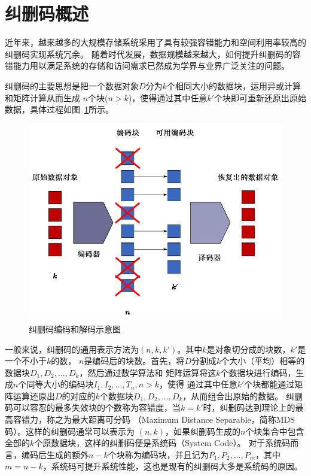 \section{纠删码概述}
近年来，越来越多的大规模存储系统采用了具有较强容错能力和空间利用率较高的纠删码实现系统冗余\citep{xia2007robustore,kubiatowicz2000oceanstore}。
随着时代发展，数据规模越来越大，如何提升纠删码的容错能力用以满足系统的存储和访问需求已然成为学界与业界广泛关注的问题。

纠删码的主要思想是把一个数据对象$D$分为$k$个相同大小的数据块，运用异或计算和矩阵计算从而生成
$n$个块($n>k$)，使得通过其中任意$k'$个块即可重新还原出原始数据，具体过程如图~\ref{fig:con-1.2}所示。

\begin{figure}[htbp]
	\centering
	\includegraphics [scale=0.8]{figures/1.2.pdf}
	\caption{纠删码编码和解码示意图}
	\label{fig:con-1.2}
\end{figure}



一般来说，纠删码的通用表示方法为$(n,k,k')$。其中$k$是对象切分成的块数，$k'$是一个不小于$k$的数，
$n$是编码后的块数。首先，将$D$分割成$k$个大小（平均）相等的数据块$D_1,D_2,...,D_k$，然后通过数学算法和
矩阵运算将这$k$个数据块进行编码，生成$n$个同等大小的编码块$I_1,I_2,...,T_n,n>k$，使得
通过其中任意$k'$个块都能通过矩阵运算还原出$D$的对应的$k$个数据块$D_1,D_2,...,D_k$，从而组合出原始的数据。
纠删码可以容忍的最多失效块的个数称为容错度，当$k=k'$时，纠删码达到理论上的最高容错力，称之为最大距离可分码
（Maximum Distance Separable，简称MDS码）\cite{blaum1996mds}。这样的纠删码通常可以表示为
$(n,k)$，如果纠删码生成的$n$个块集合中包含全部的$k$个原数据块，这样的纠删码便是系统码（System Code）\cite{plank2009raid}。
对于系统码而言，编码后生成的额外$n-k$个块称为编码块，并且记为$P_1,P_2,...,P_m$，其中
$m=n-k$，系统码可提升系统性能，这也是现有的纠删码大多是系统码的原因。

